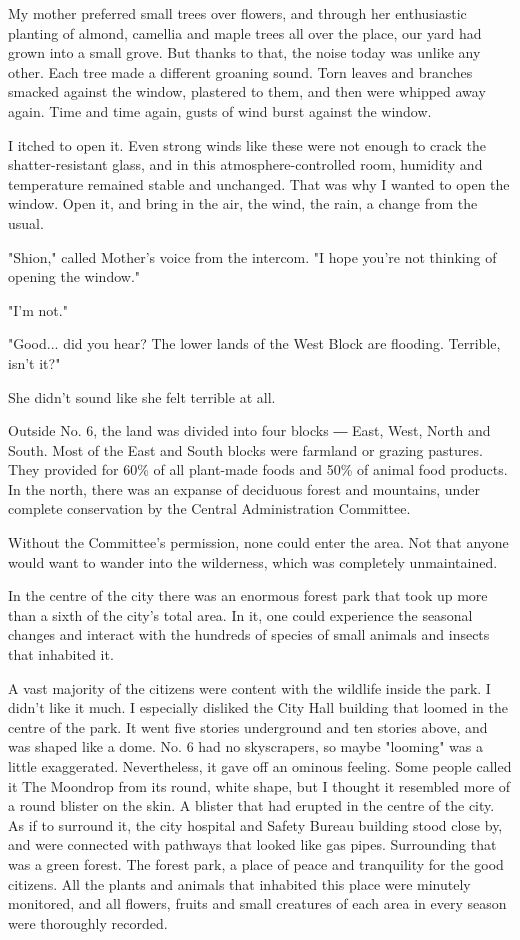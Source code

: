 My mother preferred small trees over flowers, and through her
enthusiastic planting of almond, camellia and maple trees all over the
place, our yard had grown into a small grove. But thanks to that, the
noise today was unlike any other. Each tree made a different groaning
sound. Torn leaves and branches smacked against the window, plastered to
them, and then were whipped away again. Time and time again, gusts of
wind burst against the window.

I itched to open it. Even strong winds like these were not enough to
crack the shatter-resistant glass, and in this atmosphere-controlled
room, humidity and temperature remained stable and unchanged. That was
why I wanted to open the window. Open it, and bring in the air, the
wind, the rain, a change from the usual.

"Shion," called Mother's voice from the intercom. "I hope you're not
thinking of opening the window."

"I'm not."

"Good... did you hear? The lower lands of the West Block are flooding.
Terrible, isn't it?"

She didn't sound like she felt terrible at all.

Outside No. 6, the land was divided into four blocks ― East, West, North
and South. Most of the East and South blocks were farmland or grazing
pastures. They provided for 60\% of all plant-made foods and 50\% of
animal food products. In the north, there was an expanse of deciduous
forest and mountains, under complete conservation by the Central
Administration Committee.

Without the Committee's permission, none could enter the area. Not that
anyone would want to wander into the wilderness, which was completely
unmaintained.

In the centre of the city there was an enormous forest park that took up
more than a sixth of the city's total area. In it, one could experience
the seasonal changes and interact with the hundreds of species of small
animals and insects that inhabited it.

A vast majority of the citizens were content with the wildlife inside
the park. I didn't like it much. I especially disliked the City Hall
building that loomed in the centre of the park. It went five stories
underground and ten stories above, and was shaped like a dome. No. 6 had
no skyscrapers, so maybe "looming" was a little exaggerated.
Nevertheless, it gave off an ominous feeling. Some people called it The
Moondrop from its round, white shape, but I thought it resembled more of
a round blister on the skin. A blister that had erupted in the centre of
the city. As if to surround it, the city hospital and Safety Bureau
building stood close by, and were connected with pathways that looked
like gas pipes. Surrounding that was a green forest. The forest park, a
place of peace and tranquility for the good citizens. All the plants and
animals that inhabited this place were minutely monitored, and all
flowers, fruits and small creatures of each area in every season were
thoroughly recorded.


